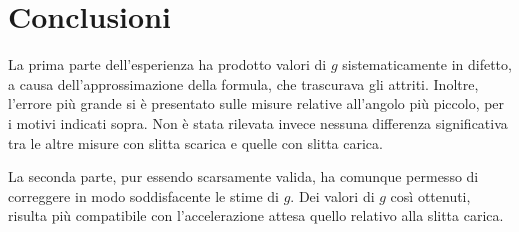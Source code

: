 \documentclass[italian,a4paper]{article}
\begin{document}
\section{Conclusioni}
La prima parte dell'esperienza ha prodotto valori di $g$ sistematicamente in difetto, a causa dell'approssimazione della formula, che trascurava gli attriti. Inoltre, l'errore più grande si è presentato sulle misure relative all'angolo più piccolo, per i motivi indicati sopra. Non è stata rilevata invece nessuna differenza significativa tra le altre misure con slitta scarica e quelle con slitta carica.

La seconda parte, pur essendo scarsamente valida, ha comunque permesso di correggere in modo soddisfacente le stime di $g$. Dei valori di $g$ così ottenuti, risulta più compatibile con l'accelerazione attesa quello relativo alla slitta carica. 
\newpage
\end{document}
